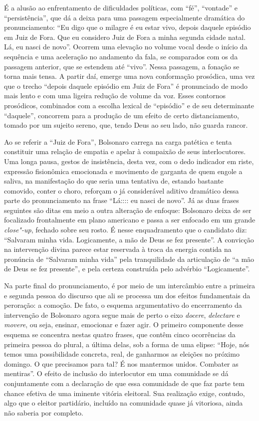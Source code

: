 É a alusão ao enfrentamento de dificuldades políticas, com ``fé'',
``vontade'' e ``persistência'', que dá a deixa para uma passagem
especialmente dramática do pronunciamento: ``Eu digo que o milagre é eu
estar vivo, depois daquele episódio em Juiz de Fora. Que eu considero
Juiz de Fora a minha segunda cidade natal. Lá, eu nasci de novo''.
Ocorrem uma elevação no volume vocal desde o início da sequência e uma
aceleração no andamento da fala, se comparados com os da passagem
anterior, que se estendem até ``vivo''. Nessa passagem, a fonação se
torna mais tensa. A partir daí, emerge uma nova conformação prosódica,
uma vez que o trecho ``depois daquele episódio em Juiz de Fora'' é
pronunciado de modo mais lento e com uma ligeira redução de volume da
voz. Esses contornos prosódicos, combinados com a escolha lexical de
``episódio'' e de seu determinante ``daquele'', concorrem para a
produção de um efeito de certo distanciamento, tomado por um sujeito
sereno, que, tendo Deus ao seu lado, não guarda rancor.

Ao se referir a ``Juiz de Fora'', Bolsonaro carrega na carga patética e
tenta constituir uma relação de empatia e apelar à compaixão de seus
interlocutores. Uma longa pausa, gestos de insistência, desta vez, com o
dedo indicador em riste, expressão fisionômica emocionada e movimento de
garganta de quem engole a saliva, na manifestação do que seria uma
tentativa de, estando bastante comovido, conter o choro, reforçam o já
considerável aditivo dramático dessa parte do pronunciamento na frase
``Lá:::: eu nasci de novo''. Já as duas frases seguintes são ditas em
meio a outra alteração de enfoque: Bolsonaro deixa de ser focalizado
frontalmente em plano americano e passa a ser enfocado em um grande
\emph{close"-up}, fechado sobre seu rosto. É nesse enquadramento que o
candidato diz: ``Salvaram minha vida. Logicamente, a mão de Deus se fez
presente''. A convicção na intervenção divina parece estar reservada à
troca da energia contida na pronúncia de ``Salvaram minha vida'' pela
tranquilidade da articulação de ``a mão de Deus se fez presente'', e
pela certeza construída pelo advérbio ``Logicamente''.

Na parte final do pronunciamento, é por meio de um intercâmbio entre a
primeira e segunda pessoa do discurso que ali se processa um dos efeitos
fundamentais da peroração: a comoção. De fato, o esquema argumentativo
do encerramento da intervenção de Bolsonaro agora segue mais de perto o
eixo \emph{docere}, \emph{delectare} e \emph{movere}, ou seja, ensinar,
emocionar e fazer agir. O primeiro componente desse esquema se concentra
nestas quatro frases, que contêm cinco ocorrências da primeira pessoa do
plural, a última delas, sob a forma de uma elipse: ``Hoje, nós temos uma
possibilidade concreta, real, de ganharmos as eleições no próximo
domingo. O que precisamos para tal? É nos mantermos unidos. Combater as
mentiras''. O efeito de inclusão do interlocutor em uma comunidade se dá
conjuntamente com a declaração de que essa comunidade de que faz parte
tem chance efetiva de uma iminente vitória eleitoral. Sua realização
exige, contudo, algo que o eleitor partidário, incluído na comunidade
quase já vitoriosa, ainda não saberia por completo.

